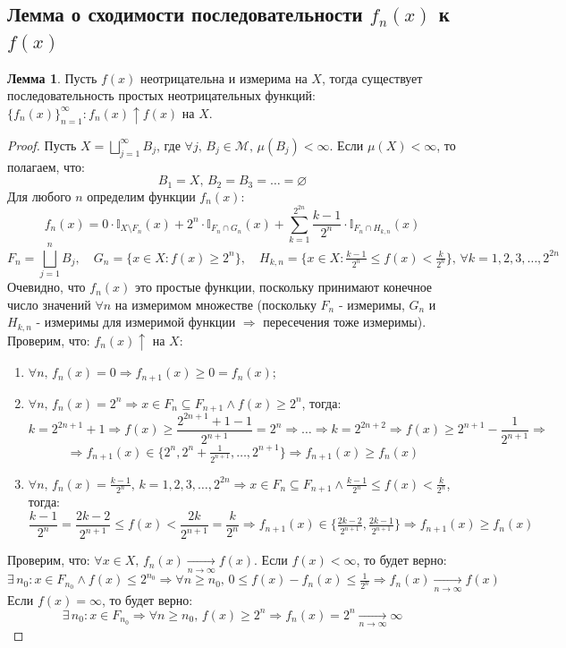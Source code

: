 \documentclass[12pt]{article}
\newcommand{\MTI}{\mathbb{I}}
\newcommand{\MM}{\mathcal{M}}
\newcommand{\VN}{\varnothing}
\theoremstyle{definition}
\newtheorem{lemma}{Лемма}
\newcommand{\ddsum}[2]{\displaystyle\sum\limits_{#1}^{#2}}
\begin{document}
\subsection*{Лемма о сходимости последовательности $f_n(x)$ к $f(x)$}
\begin{lemma}
	Пусть $f(x)$ неотрицательна и измерима на $X$, тогда существует последовательность простых неотрицательных функций: $\{f_n(x)\}_{n = 1}^{\infty}\colon f_n(x) \uparrow f(x)$ на $X$.
\end{lemma}
\begin{proof}
	Пусть $X = \bigsqcup\limits_{j = 1}^{\infty}B_j$, где $\forall j, \, B_j \in \MM, \, \mu(B_j) < \infty$. Если $\mu(X) < \infty$, то полагаем, что: 
	$$
		B_1 = X, \, B_2 = B_3 = \dotsc = \VN
	$$
	Для любого $n$ определим функции $f_n(x)$:
	$$
		f_n(x) = 0{\cdot}\MTI_{X \setminus F_n}(x) + 2^n{\cdot}\MTI_{F_n \cap G_n}(x) + \ddsum{k = 1}{2^{2n}}\dfrac{k - 1}{2^n}{\cdot}\MTI_{F_n \cap H_{k,n}}(x)
	$$
	$$
		F_n = \bigsqcup\limits_{j = 1}^{n}B_j, \quad G_n = \{x \in X \colon f(x) \geq 2^n\}, \quad H_{k,n} = \{x \in X \colon \tfrac{k-1}{2^n} \leq f(x) < \tfrac{k}{2^n}\}, \, \forall k = 1,2,3,\dotsc, 2^{2n}
	$$
	Очевидно, что $f_n(x)$ это простые функции, поскольку принимают конечное число значений $\forall n$ на измеримом множестве (поскольку $F_n$ - измеримы, $G_n$ и $H_{k,n}$ - измеримы для измеримой функции $\Rightarrow$ пересечения тоже измеримы). Проверим, что: $f_n(x) \uparrow$ на $X$:
	\begin{enumerate}[label=\arabic*)]
		\item $\forall n, \, f_n(x) = 0 \Rightarrow f_{n+1}(x) \geq 0 = f_n(x)$;
		\item $\forall n, \, f_n(x) = 2^n \Rightarrow x \in F_n \subseteq F_{n+1} \wedge f(x) \geq 2^n$, тогда: 
		$$
			k = 2^{2n + 1} + 1 \Rightarrow f(x) \geq \dfrac{2^{2n + 1} + 1 - 1}{2^{n+1}} = 2^n \Rightarrow  \dotsc \Rightarrow k = 2^{2n+2} \Rightarrow f(x) \geq 2^{n+1} - \dfrac{1}{2^{n+1}} \Rightarrow
		$$
		$$
			\Rightarrow f_{n+1}(x) \in \{2^n, 2^n + \tfrac{1}{2^{n+1}}, \dotsc, 2^{n+1}\} \Rightarrow f_{n+1}(x) \geq f_n(x)
		$$                                                                    
		\item $\forall  n, \, f_n(x) = \tfrac{k-1}{2^n}, \, k = 1,2,3, \dotsc, 2^{2n} \Rightarrow  x \in F_n \subseteq F_{n+1} \wedge \tfrac{k-1}{2^n} \leq f(x) < \tfrac{k}{2^n}$, тогда:
		$$
			\dfrac{k-1}{2^n} = \dfrac{2k - 2}{2^{n+1}} \leq f(x) < \dfrac{2k}{2^{n+1}} = \dfrac{k}{2^n} \Rightarrow f_{n+1}(x) \in \{\tfrac{2k-2}{2^{n+1}}, \tfrac{2k - 1}{2^{n+1}} \} \Rightarrow f_{n+1}(x) \geq f_n(x)
		$$                                              
	\end{enumerate}	
	Проверим, что: $\forall x \in X, \, f_n(x) \xrightarrow[n \to \infty]{} f(x)$. Если $f(x) < \infty$, то будет верно: 
	$$
		\exists \, n_0 \colon x \in F_{n_0} \wedge f(x) \leq 2^{n_0} \Rightarrow \forall n \geq n_0, \, 0 \leq f(x) - f_n(x) \leq \tfrac{1}{2^n} \Rightarrow f_n(x) \xrightarrow[n \to \infty]{} f(x)
	$$
	Если $f(x) = \infty$, то будет верно:
	$$
		\exists \, n_0 \colon x \in F_{n_0} \Rightarrow \forall n \geq n_0, \, f(x) \geq 2^n \Rightarrow  f_n(x) = 2^n \xrightarrow[n \to \infty]{} \infty
	$$
\end{proof}
\end{document}
